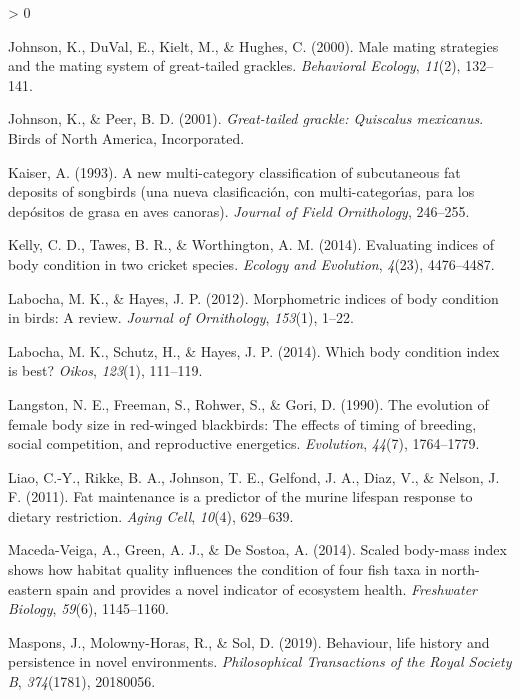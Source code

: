 \documentclass[
]{article}
\newlength{\cslhangindent}
\newenvironment{CSLReferences}[2] %
 {%
  \setlength{\parindent}{0pt}
  \ifodd #1 \everypar{\setlength{\hangindent}{\cslhangindent}}\ignorespaces\fi
  \ifnum #2 > 0
  \setlength{\parskip}{#2\baselineskip}
  \fi
 }%
 {}
\begin{document}
\begin{CSLReferences}{1}{0}
\leavevmode\hypertarget{ref-johnson2000male}{}%
Johnson, K., DuVal, E., Kielt, M., \& Hughes, C. (2000). Male mating
strategies and the mating system of great-tailed grackles.
\emph{Behavioral Ecology}, \emph{11}(2), 132--141.

\leavevmode\hypertarget{ref-johnson2001great}{}%
Johnson, K., \& Peer, B. D. (2001). \emph{Great-tailed grackle:
Quiscalus mexicanus}. Birds of North America, Incorporated.

\leavevmode\hypertarget{ref-kaiser1993new}{}%
Kaiser, A. (1993). A new multi-category classification of subcutaneous
fat deposits of songbirds (una nueva clasificaci{ó}n, con
multi-categor{ı́}as, para los dep{ó}sitos de grasa en aves canoras).
\emph{Journal of Field Ornithology}, 246--255.

\leavevmode\hypertarget{ref-kelly2014evaluating}{}%
Kelly, C. D., Tawes, B. R., \& Worthington, A. M. (2014). Evaluating
indices of body condition in two cricket species. \emph{Ecology and
Evolution}, \emph{4}(23), 4476--4487.

\leavevmode\hypertarget{ref-labocha2012morphometric}{}%
Labocha, M. K., \& Hayes, J. P. (2012). Morphometric indices of body
condition in birds: A review. \emph{Journal of Ornithology},
\emph{153}(1), 1--22.

\leavevmode\hypertarget{ref-labocha2014body}{}%
Labocha, M. K., Schutz, H., \& Hayes, J. P. (2014). Which body condition
index is best? \emph{Oikos}, \emph{123}(1), 111--119.

\leavevmode\hypertarget{ref-langston1990evolution}{}%
Langston, N. E., Freeman, S., Rohwer, S., \& Gori, D. (1990). The
evolution of female body size in red-winged blackbirds: The effects of
timing of breeding, social competition, and reproductive energetics.
\emph{Evolution}, \emph{44}(7), 1764--1779.

\leavevmode\hypertarget{ref-liao2011fat}{}%
Liao, C.-Y., Rikke, B. A., Johnson, T. E., Gelfond, J. A., Diaz, V., \&
Nelson, J. F. (2011). Fat maintenance is a predictor of the murine
lifespan response to dietary restriction. \emph{Aging Cell},
\emph{10}(4), 629--639.

\leavevmode\hypertarget{ref-maceda2014scaled}{}%
Maceda-Veiga, A., Green, A. J., \& De Sostoa, A. (2014). Scaled
body-mass index shows how habitat quality influences the condition of
four fish taxa in north-eastern spain and provides a novel indicator of
ecosystem health. \emph{Freshwater Biology}, \emph{59}(6), 1145--1160.

\leavevmode\hypertarget{ref-maspons2019behaviour}{}%
Maspons, J., Molowny-Horas, R., \& Sol, D. (2019). Behaviour, life
history and persistence in novel environments. \emph{Philosophical
Transactions of the Royal Society B}, \emph{374}(1781), 20180056.


\end{CSLReferences}
\end{document}
